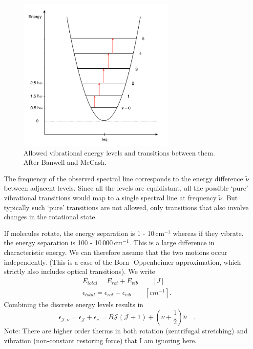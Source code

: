 \begin{figure}
\begin{center}
\includegraphics[width=0.7\textwidth]{figures/Vibration_parabol_2}
\caption{Allowed vibrational energy levels and transitions between them. After Banwell and McCash.}
\label{Vibration_parabol_2}
\end{center}
\end{figure}

The frequency of the observed spectral line corresponds to the energy
difference $\tilde{\nu}$ between adjacent levels. Since all the levels
are equidistant, all the possible `pure' vibrational transitions would
map to a single spectral line at frequency $\tilde{\nu}$. But
typically such `pure' transitions are not allowed, only transitions
that also involve changes in the rotational state.

If molecules rotate, the energy separation is 1 - 10\,cm$^{-1}$
whereas if they vibrate, the energy separation is 100 -
10\,000\,cm$^{-1}$. This is a large difference in characteristic
energy. We can therefore assume that the two motions occur
independently.  (This is a case of the Born- Oppenheimer
approximation, which strictly also includes optical transitions). We
write
 \begin{gather}
E_{total} = E_{rot} + E_{vib} \qquad \left[J\right]  \\
\epsilon_{total} = \epsilon_{rot} + \epsilon_{vib} \qquad \left[cm^{-1}\right].
 \end{gather}
Combining the discrete energy levels results in
\begin{equation}
\epsilon_{\mathcal{J},\nu} = \epsilon_{\mathcal{J}} + \epsilon_{\nu} =
B \mathcal{J} (\mathcal{J} + 1) + (\nu + \frac{1}{2})\tilde{\nu} \quad .
\end{equation}
Note: There are higher order therms in both rotation (zentrifugal stretching) and vibration (non-constant restoring force) that I am ignoring here. \par
 
